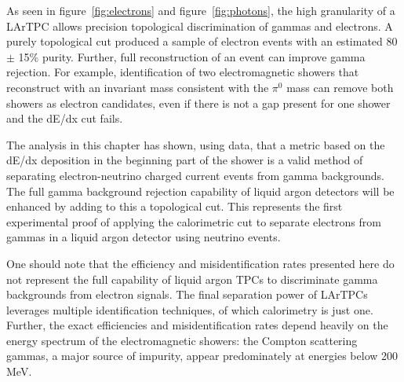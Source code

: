 As seen in figure~\ref{fig:electrons} and figure~\ref{fig:photons}, the high granularity of a LArTPC allows precision topological discrimination of gammas and electrons.  A purely topological cut produced a sample of electron events with an estimated 80 $\pm$ 15\% purity.  Further, full reconstruction of an event can improve gamma rejection.  For example, identification of two electromagnetic showers that reconstruct with an invariant mass consistent with the $\pi^0$ mass can remove both showers as electron candidates, even if there is not a gap present for one shower and the dE/dx cut fails.

The analysis in this chapter has shown, using data, that a metric based on the dE/dx deposition in the beginning part of the shower is a valid method of separating electron-neutrino charged current events from gamma backgrounds. The full gamma background rejection capability of liquid argon detectors will be enhanced by adding to this a topological cut. This represents the first experimental proof of applying the calorimetric cut to separate electrons from gammas in a liquid argon detector using neutrino events.

One should note that the efficiency and misidentification rates presented here do not represent the full capability of liquid argon TPCs to discriminate gamma backgrounds from electron signals. The final separation power of LArTPCs leverages multiple identification techniques, of which calorimetry is just one.  Further, the exact efficiencies and misidentification rates depend heavily on the energy spectrum of the electromagnetic showers: the Compton scattering gammas, a major source of impurity, appear predominately at energies below 200 MeV.


